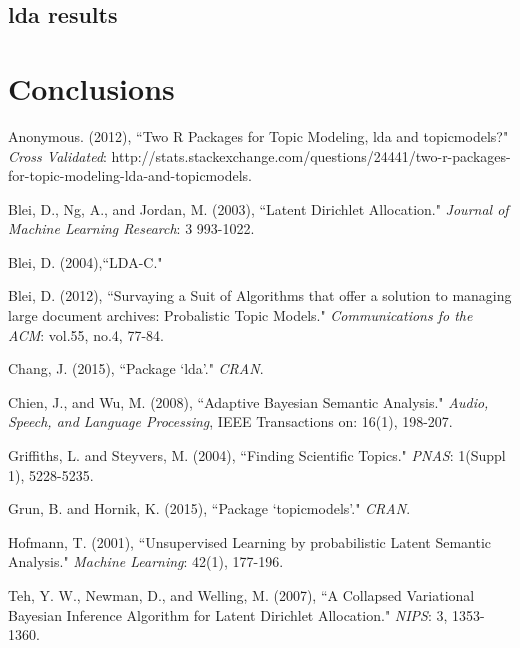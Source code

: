 \documentclass[3p,times]{elsarticle}
\begin{document}
	\subsection{lda results}

\section{Conclusions}




	\begin{thebibliography}{4}
	Anonymous. (2012),
	``Two R Packages for Topic Modeling, lda and topicmodels?" \textit{Cross Validated}: http://stats.stackexchange.com/questions/24441/two-r-packages-for-topic-modeling-lda-and-topicmodels.

	Blei, D., Ng, A., and Jordan, M.  (2003),
	``Latent Dirichlet Allocation."
	\textit{Journal of Machine Learning Research}: 3 993-1022.

	Blei, D. (2004),``LDA-C."

	Blei, D.  (2012),
	``Survaying a Suit of Algorithms that offer a solution to managing large document archives:          Probalistic Topic Models." \textit{Communications fo the ACM}: vol.55, no.4, 77-84.

	Chang, J.  (2015),
	``Package `lda'."
	\textit{CRAN}.

	Chien, J., and Wu, M.  (2008),
	``Adaptive Bayesian Semantic Analysis."
	\textit{Audio, Speech, and Language Processing}, IEEE Transactions on: 16(1), 198-207.

	Griffiths, L. and Steyvers, M.  (2004),
	``Finding Scientific Topics."
	\textit{PNAS}: 1(Suppl 1), 5228-5235.

	Grun, B. and Hornik, K.  (2015),
	``Package `topicmodels'."
	\textit{CRAN}.

	Hofmann, T.  (2001),
	``Unsupervised Learning by probabilistic Latent Semantic Analysis."
	\textit{Machine Learning}: 42(1), 177-196.

	Teh, Y. W., Newman, D., and Welling, M.  (2007),
	``A Collapsed Variational Bayesian Inference Algorithm for Latent Dirichlet Allocation."
	\textit{NIPS}: 3, 1353-1360.


	\end{thebibliography}
\end{document}
